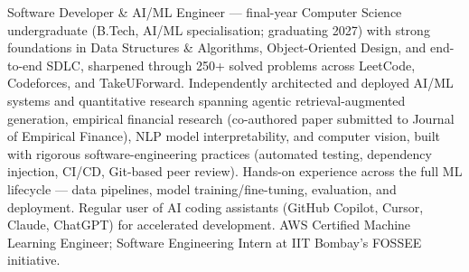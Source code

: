 Software Developer \& AI/ML Engineer --- final-year Computer Science undergraduate (B.Tech, AI/ML specialisation; graduating 2027) with strong foundations in Data Structures \& Algorithms, Object-Oriented Design, and end-to-end SDLC, sharpened through 250+ solved problems across LeetCode, Codeforces, and TakeUForward. Independently architected and deployed AI/ML systems and quantitative research spanning agentic retrieval-augmented generation, empirical financial research (co-authored paper submitted to Journal of Empirical Finance), NLP model interpretability, and computer vision, built with rigorous software-engineering practices (automated testing, dependency injection, CI/CD, Git-based peer review). Hands-on experience across the full ML lifecycle --- data pipelines, model training/fine-tuning, evaluation, and deployment. Regular user of AI coding assistants (GitHub Copilot, Cursor, Claude, ChatGPT) for accelerated development. AWS Certified Machine Learning Engineer; Software Engineering Intern at IIT Bombay's FOSSEE initiative.